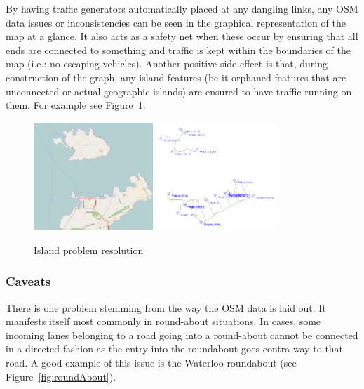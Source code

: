 By having traffic generators automatically placed at any dangling links, any OSM data issues or inconsistencies can be seen in the graphical representation of the map at a glance. It also acts as a safety net when these occur by ensuring that all ends are connected to something and traffic is kept within the boundaries of the map (i.e.: no escaping vehicles). Another positive side effect is that, during construction of the graph, any island features (be it orphaned features that are unconnected or actual geographic islands) are ensured to have traffic running on them. For example see Figure~\ref{fig:islandReal}.

\begin{figure}[!h]
	\vspace{1.5em}
  	\caption{Island problem resolution}
  	\label{fig:islandReal}
  	\centering
	\includegraphics[width=0.4\textwidth]{figs/trafficGenerator/IslandExample_realmap.png}
	\hspace{0.2em}
	\includegraphics[width=0.40\textwidth]{figs/trafficGenerator/IslandExample_simmap.png}
  	\vspace{1.5em}
\end{figure}

\subsubsection{Caveats}
There is one problem stemming from the way the OSM data is laid out. It manifests itself most commonly in round-about situations. In cases, some incoming lanes belonging to a road going into a round-about cannot be connected in a directed fashion as the entry into the roundabout goes contra-way to that road. A good example of this issue is the Waterloo roundabout (see Figure~\ref{fig:roundAbout}).

